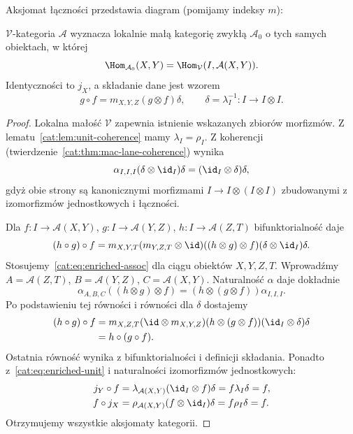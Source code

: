 Aksjomat łączności przedstawia diagram (pomijamy indeksy $m$):
\begin{center}
\end{center}

\begin{twierdzenie}\label{cat:thm:enriched-underlying}
$\mathcal V$-kategoria $\mathcal A$ wyznacza lokalnie małą kategorię zwykłą $\mathcal A_0$ o tych samych obiektach, w której
\[
 \Hom_{\mathcal A_0}(X,Y)=\Hom_{\mathcal V}(I,\mathcal A(X,Y)).
\]
Identyczności to $j_X$, a składanie dane jest wzorem
\[
 g\circ f=m_{X,Y,Z}(g\otimes f)\delta,\qquad
 \delta=\lambda_I^{-1}:I\to I\otimes I.
\]
\end{twierdzenie}
\begin{proof}
Lokalna małość $\mathcal V$ zapewnia istnienie wskazanych zbiorów morfizmów. Z lematu~\ref{cat:lem:unit-coherence} mamy $\lambda_I=\rho_I$. Z koherencji (twierdzenie~\ref{cat:thm:mac-lane-coherence}) wynika
\[
 \alpha_{I,I,I}(\delta\otimes\id_I)\delta
 =(\id_I\otimes\delta)\delta,
\]
gdyż obie strony są kanonicznymi morfizmami $I\to I\otimes(I\otimes I)$ zbudowanymi z izomorfizmów jednostkowych i łączności.

Dla $f:I\to\mathcal A(X,Y)$, $g:I\to\mathcal A(Y,Z)$, $h:I\to\mathcal A(Z,T)$ bifunktorialność daje
\[
 (h\circ g)\circ f
 =m_{X,Y,T}(m_{Y,Z,T}\otimes\id)
 ((h\otimes g)\otimes f)(\delta\otimes\id_I)\delta.
\]
Stosujemy~\eqref{cat:eq:enriched-assoc} dla ciągu obiektów $X,Y,Z,T$. Wprowadźmy $A=\mathcal A(Z,T)$, $B=\mathcal A(Y,Z)$, $C=\mathcal A(X,Y)$. Naturalność $\alpha$ daje dokładnie
\[
 \alpha_{A,B,C}((h\otimes g)\otimes f)
 =(h\otimes(g\otimes f))\alpha_{I,I,I}.
\]
Po podstawieniu tej równości i równości dla $\delta$ dostajemy
\[
 \begin{aligned}
 (h\circ g)\circ f
 &=m_{X,Z,T}(\id\otimes m_{X,Y,Z})
 (h\otimes(g\otimes f))(\id_I\otimes\delta)\delta\\
 &=h\circ(g\circ f).
 \end{aligned}
\]
Ostatnia równość wynika z bifunktorialności i definicji składania. Ponadto z~\eqref{cat:eq:enriched-unit} i naturalności izomorfizmów jednostkowych:
\[
\begin{aligned}
 j_Y\circ f&=\lambda_{\mathcal A(X,Y)}(\id_I\otimes f)\delta
 =f\lambda_I\delta=f,\\
 f\circ j_X&=\rho_{\mathcal A(X,Y)}(f\otimes\id_I)\delta
 =f\rho_I\delta=f.
\end{aligned}
\]
Otrzymujemy wszystkie aksjomaty kategorii.
\end{proof}

